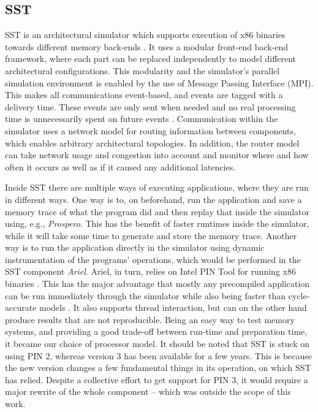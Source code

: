 \subsection{SST}
SST is an architectural simulator which supports execution of x86 binaries towards different memory back-ends \cite{rodrigues2011structural}. It uses a modular front-end back-end framework, where each part can be replaced independently to model different architectural configurations. This modularity and the simulator's parallel simulation environment is enabled by the use of Message Passing Interface (MPI). This makes all communications event-based, and events are tagged with a delivery time. These events are only sent when needed and no real processing time is unnecessarily spent on future events \cite{11.1093/comjnl/bxr069}. Communication within the simulator uses a network model for routing information between components, which enables arbitrary architectural topologies. In addition, the router model can take network usage and congestion into account and monitor where and how often it occurs as well as if it caused any additional latencies.
\bigskip

Inside SST there are multiple ways of executing applications, where they are run in different ways. One way is to, on beforehand, run the application and save a memory trace of what the program did and then replay that inside the simulator using, e.g., \emph{Prospero}. This has the benefit of faster runtimes inside the simulator, while it will take some time to generate and store the memory trace. Another way is to run the application directly in the simulator using dynamic instrumentation of the programs' operations, which would be performed in the SST component \emph{Ariel}. Ariel, in turn, relies on Intel PIN Tool for running x86 binaries \cite{Luk:2005:PBC:1065010.1065034}. This has the major advantage that mostly any precompiled application can be run immediately through the simulator while also being faster than cycle-accurate models \cite{hammond2018structural}. It also supports thread interaction, but can on the other hand produce results that are not reproducible. Being an easy way to test memory systems, and providing a good trade-off between run-time and preparation time, it became our choice of processor model. It should be noted that SST is stuck on using PIN 2, whereas version 3 has been available for a few years. This is because the new version changes a few fundamental things in its operation, on which SST has relied. Despite a collective effort to get support for PIN 3, it would require a major rewrite of the whole component -- which was outside the scope of this work.
\bigskip


